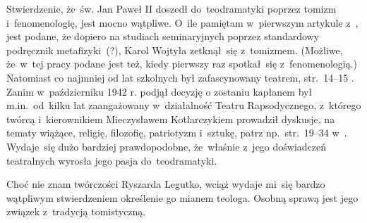 \documentclass[a4paper,11pt]{article}
\begin{document}
\vspace{\spaceTwo}














\start {} Stwierdzenie, że~św. Jan Paweł II doszedł
do~teodramatyki poprzez tomizm i~fenomenologię, jest mocno wątpliwe.
O~ile pamiętam w~pierwszym artykule z~\cite{PoslugaMysleniaTomIX2011},
jest podane, że dopiero na studiach seminaryjnych poprzez standardowy
podręcznik metafizyki~(?), Karol Wojtyła zetknął~się z~tomizmem.
(Możliwe, że~w~tej pracy podane jest też, kiedy pierwszy raz
spotkał~się z~fenomenologią.) Natomiast co najmniej od lat szkolnych
był zafascynowany teatrem, str.~14--15
\cite{NowakJanPawelIIKronikaZyciaIPontyfikatu2015}. Zanim
w~październiku 1942 r. podjął decyzję o zostaniu kapłanem był
m.in.~od~kilku lat zaangażowany w~działalność Teatru Rapsodycznego,
z~którego twórcą i~kierownikiem Mieczysławem Kotlarczykiem prowadził
dyskusje, na tematy wiążące, religię, filozofię, patriotyzm i~sztukę,
patrz np.~str.~19--34
w~\cite{NowakJanPawelIIKronikaZyciaIPontyfikatu2015}. Wydaje~się dużo
bardziej prawdopodobne, że~właśnie z~jego doświadczeń teatralnych
wyrosła jego pasja do~teodramatyki.

\vspace{\spaceFour}



\start {} Choć nie znam twórczości Ryszarda Legutko, wciąż
wydaje mi~się bardzo wątpliwym stwierdzeniem określenie go mianem
teologa. Osobną sprawą jest jego związek z~tradycją tomistyczną.





\end{document}

